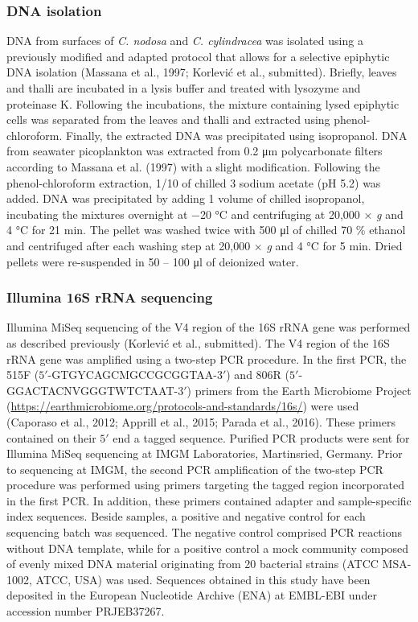 \documentclass[
  12pt,
]{article}
\begin{document}
\hypertarget{dna-isolation}{%
\subsubsection{DNA isolation}\label{dna-isolation}}

DNA from surfaces of \emph{C. nodosa} and \emph{C. cylindracea} was
isolated using a previously modified and adapted protocol that allows
for a selective epiphytic DNA isolation (Massana et al., 1997; Korlević
et al., submitted). Briefly, leaves and thalli are incubated in a lysis
buffer and treated with lysozyme and proteinase K. Following the
incubations, the mixture containing lysed epiphytic cells was separated
from the leaves and thalli and extracted using phenol-chloroform.
Finally, the extracted DNA was precipitated using isopropanol. DNA from
seawater picoplankton was extracted from 0.2 \si{\um} polycarbonate
filters according to Massana et al. (1997) with a slight modification.
Following the phenol-chloroform extraction, 1/10 of chilled 3
\si{\Molar} sodium acetate (pH 5.2) was added. DNA was precipitated by
adding 1 volume of chilled isopropanol, incubating the mixtures
overnight at \num{-20} \si{\degreeCelsius} and centrifuging at 20,000 ×
\emph{g} and 4 \si{\degreeCelsius} for 21 \si{\minute}. The pellet was
washed twice with 500 \si{\ul} of chilled 70 \si{\percent} ethanol and
centrifuged after each washing step at 20,000 × \emph{g} and 4
\si{\degreeCelsius} for 5 \si{\minute}. Dried pellets were re-suspended
in 50 -- 100 \si{\ul} of deionized water.

\hypertarget{illumina-16s-rrna-sequencing}{%
\subsubsection{Illumina 16S rRNA
sequencing}\label{illumina-16s-rrna-sequencing}}

Illumina MiSeq sequencing of the V4 region of the 16S rRNA gene was
performed as described previously (Korlević et al., submitted). The V4
region of the 16S rRNA gene was amplified using a two-step PCR
procedure. In the first PCR, the 515F
(\(5'\)-GTGYCAGCMGCCGCGGTAA-\(3'\)) and 806R
(\(5'\)-GGACTACNVGGGTWTCTAAT-\(3'\)) primers from the Earth Microbiome
Project (\url{https://earthmicrobiome.org/protocols-and-standards/16s/})
were used (Caporaso et al., 2012; Apprill et al., 2015; Parada et al.,
2016). These primers contained on their \(5'\) end a tagged sequence.
Purified PCR products were sent for Illumina MiSeq sequencing at IMGM
Laboratories, Martinsried, Germany. Prior to sequencing at IMGM, the
second PCR amplification of the two-step PCR procedure was performed
using primers targeting the tagged region incorporated in the first PCR.
In addition, these primers contained adapter and sample-specific index
sequences. Beside samples, a positive and negative control for each
sequencing batch was sequenced. The negative control comprised PCR
reactions without DNA template, while for a positive control a mock
community composed of evenly mixed DNA material originating from 20
bacterial strains (ATCC MSA-1002, ATCC, USA) was used. Sequences
obtained in this study have been deposited in the European Nucleotide
Archive (ENA) at EMBL-EBI under accession number PRJEB37267.
\end{document}
